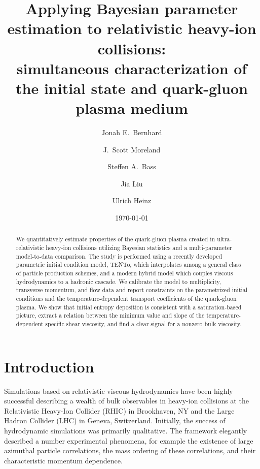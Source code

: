 \documentclass[aps,prc,reprint,amsmath,nofootinbib]{revtex4-1}
\newcommand{\trento}{T\raisebox{-0.5ex}{R}ENTo}
\begin{document}
\title{
  Applying Bayesian parameter estimation to relativistic heavy-ion collisions: \\
  simultaneous characterization of the initial state and quark-gluon plasma medium
}

\author{Jonah E.\ Bernhard}
\author{J.\ Scott Moreland}
\author{Steffen A.\ Bass}

\author{Jia Liu}
\author{Ulrich Heinz}

\date{\today}

\begin{abstract}
  We quantitatively estimate properties of the quark-gluon plasma created in ultra-relativistic heavy-ion collisions utilizing Bayesian statistics and a multi-parameter model-to-data comparison.
  The study is performed using a recently developed parametric initial condition model, \trento, which interpolates among a general class of particle production schemes, and a modern hybrid model which couples viscous hydrodynamics to a hadronic cascade.
  We calibrate the model to multiplicity, transverse momentum, and flow data and report constraints on the parametrized initial conditions and the temperature-dependent transport coefficients of the quark-gluon plasma.
  We show that initial entropy deposition is consistent with a saturation-based picture, extract a relation between the minimum value and slope of the temperature-dependent specific shear viscosity, and find a clear signal for a nonzero bulk viscosity.
\end{abstract}

\maketitle


\section{Introduction}

Simulations based on relativistic viscous hydrodynamics have been highly successful describing a wealth of bulk observables in heavy-ion collisions at the Relativistic Heavy-Ion Collider (RHIC) in Brookhaven, NY and the Large Hadron Collider (LHC) in Geneva, Switzerland.
Initially, the success of hydrodynamic simulations was primarily qualitative.
The framework elegantly described a number experimental phenomena, for example the existence of large azimuthal particle correlations, the mass ordering of these correlations, and their characteristic momentum dependence.
\end{document}
